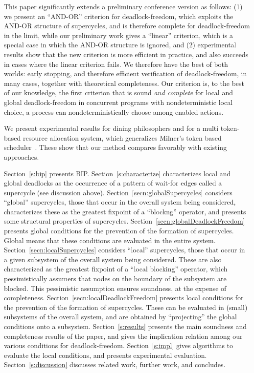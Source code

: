 This paper significantly extends a preliminary conference version \cite{FORTE13} as
follows: 
(1) we present an ``AND-OR'' criterion for deadlock-freedom, which exploits the AND-OR structure of supercycles, and is therefore complete for
deadlock-freedom in the limit, while our preliminary work \cite{FORTE13} gives a ``linear'' criterion, which is a special case in which the AND-OR structure is ignored, and
(2) experimental results show that the new criterion is more efficient
in practice, and also succeeds in cases where the linear criterion
fails.
We therefore have the best of both worlds: early stopping, and
therefore efficient verification of deadlock-freedom, in many cases,
together with theoretical completeness.
%
Our criterion is, to the best of our knowledge, the first criterion that is sound \emph{and complete} for local and global deadlock-freedom in
concurrent programs with nondeterministic local choice, \ie a process can nondeterministically choose among enabled actions.

We present experimental results for dining philosophers and for a multi token-based resource allocation system, which generalizes Milner's token based
scheduler~\cite{milner}.  These show that our method compares favorably with existing approaches.



Section~\ref{s:bip} presents BIP.  Section~\ref{s:characterize} characterizes local and global deadlocks as the occurrence of a pattern of wait-for
edges called a supercycle (see discussion above).   Section~\ref{secn:globalSupercycles} considers ``global''
supercycles, \ie those that occur in the overall system being considered, characterizes these as the greatest fixpoint of a ``blockng'' operator, and
presents some structural properties of supercycles. Section~\ref{secn:globalDeadlockFreedom} presents global conditions for the prevention of the
formation of supercycles. Global means that these conditions are evaluated in the entire system.  Section~\ref{secn:localSupercycles} considers
``local'' supercycles, \ie those that occur in a given subsystem of the overall system being considered.  These are also characterized as the greatest
fixpoint of a ``local blocking'' operator, which pessimistically assumers that nodes on the boundary of the subsystem are blocked. This pessimistic
assumption ensures soundness, at the expense of completeness.  Section~\ref{secn:localDeadlockFreedom} presents local conditions for the prevention of
the formation of supercycles. These can be evaluated in (small) subsystems of the overall system, and are obtained by ``projecting'' the global
conditions onto a subsystem.  Section~\ref{s:results} presents the main soundness and completeness results of the paper, and gives the implication
relation among our various conditions for deadlock-freedom.  Section~\ref{s:impl} gives algorithms to evaluate the local conditions, and presents
experimental evaluation.  Section~\ref{s:discussion} discusses related work, further work, and concludes.
